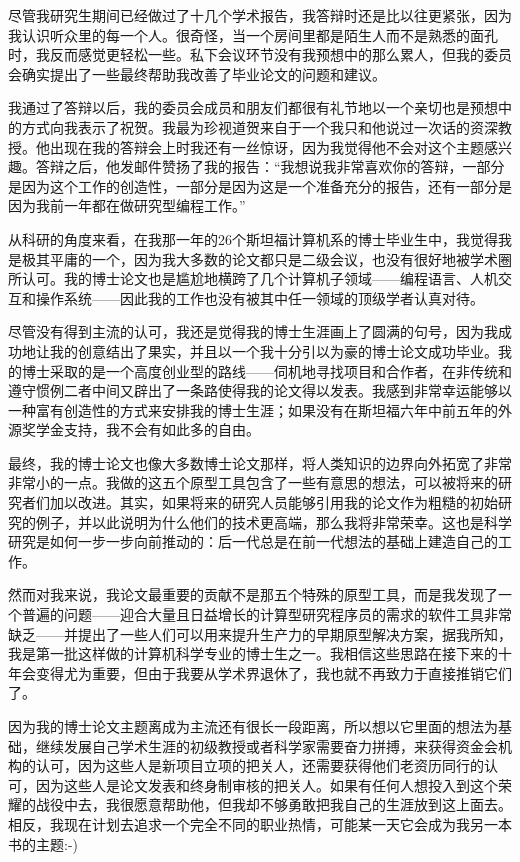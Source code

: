 \documentclass[12pt,UTF8,nofonts]{book}
\begin{document}
尽管我研究生期间已经做过了十几个学术报告，我答辩时还是比以往更紧张，因为我认识听众里的每一个人。很奇怪，当一个房间里都是陌生人而不是熟悉的面孔时，我反而感觉更轻松一些。私下会议环节没有我预想中的那么累人，但我的委员会确实提出了一些最终帮助我改善了毕业论文的问题和建议。

我通过了答辩以后，我的委员会成员和朋友们都很有礼节地以一个亲切也是预想中的方式向我表示了祝贺。我最为珍视道贺来自于一个我只和他说过一次话的资深教授。他出现在我的答辩会上时我还有一丝惊讶，因为我觉得他不会对这个主题感兴趣。答辩之后，他发邮件赞扬了我的报告：“我想说我非常喜欢你的答辩，一部分是因为这个工作的创造性，一部分是因为这是一个准备充分的报告，还有一部分是因为我前一年都在做研究型编程工作。”

\breakline

从科研的角度来看，在我那一年的26个斯坦福计算机系的博士毕业生中，我觉得我是极其平庸的一个，因为我大多数的论文都只是二级会议，也没有很好地被学术圈所认可。我的博士论文也是尴尬地横跨了几个计算机子领域——编程语言、人机交互和操作系统——因此我的工作也没有被其中任一领域的顶级学者认真对待。

尽管没有得到主流的认可，我还是觉得我的博士生涯画上了圆满的句号，因为我成功地让我的创意结出了果实，并且以一个我十分引以为豪的博士论文成功毕业。我的博士采取的是一个高度创业型的路线——伺机地寻找项目和合作者，在非传统和遵守惯例二者中间又辟出了一条路使得我的论文得以发表。我感到非常幸运能够以一种富有创造性的方式来安排我的博士生涯；如果没有在斯坦福六年中前五年的外源奖学金支持，我不会有如此多的自由。

最终，我的博士论文也像大多数博士论文那样，将人类知识的边界向外拓宽了非常非常小的一点。我做的这五个原型工具包含了一些有意思的想法，可以被将来的研究者们加以改进。其实，如果将来的研究人员能够引用我的论文作为粗糙的初始研究的例子，并以此说明为什么他们的技术更高端，那么我将非常荣幸。这也是科学研究是如何一步一步向前推动的：后一代总是在前一代想法的基础上建造自己的工作。

然而对我来说，我论文最重要的贡献不是那五个特殊的原型工具，而是我发现了一个普遍的问题——迎合大量且日益增长的计算型研究程序员的需求的软件工具非常缺乏——并提出了一些人们可以用来提升生产力的早期原型解决方案，据我所知，我是第一批这样做的计算机科学专业的博士生之一。我相信这些思路在接下来的十年会变得尤为重要，但由于我要从学术界退休了，我也就不再致力于直接推销它们了。

因为我的博士论文主题离成为主流还有很长一段距离，所以想以它里面的想法为基础，继续发展自己学术生涯的初级教授或者科学家需要奋力拼搏，来获得资金会机构的认可，因为这些人是新项目立项的把关人，还需要获得他们老资历同行的认可，因为这些人是论文发表和终身制审核的把关人。如果有任何人想投入到这个荣耀的战役中去，我很愿意帮助他，但我却不够勇敢把我自己的生涯放到这上面去。相反，我现在计划去追求一个完全不同的职业热情，可能某一天它会成为我另一本书的主题:-)
\end{document}
